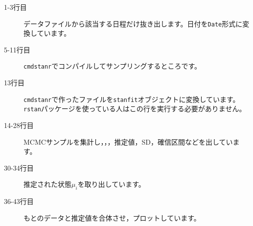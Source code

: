 \begin{description}
	\item[1-3行目] データファイルから該当する日程だけ抜き出します。日付を\verb|Date|形式に変換しています。
	\item[5-11行目] \verb|cmdstanr|でコンパイルしてサンプリングするところです。
	\item[13行目] \verb|cmdstanr|で作ったファイルを\verb|stanfit|オブジェクトに変換しています。\verb|rstan|パッケージを使っている人はこの行を実行する必要がありません。
	\item[14-28行目] MCMCサンプルを集計し，，，推定値，SD，確信区間などを出しています。
	\item[30-34行目] 推定された状態$\mu_i$を取り出しています。
	\item[36-43行目] もとのデータと推定値を合体させ，プロットしています。
\end{description}
